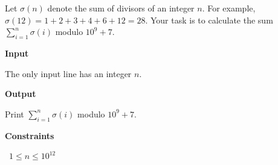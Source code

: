 Let $\sigma(n)$ denote the sum of divisors of an integer $n$. For example, $\sigma(12)=1+2+3+4+6+12=28$.
Your task is to calculate the sum $\sum_{i=1}^n \sigma(i)$ modulo $10^9+7$.

\vspace{0.3cm}\noindent\textbf{Input}

The only input line has an integer $n$.

\vspace{0.3cm}\noindent\textbf{Output}

Print $\sum_{i=1}^n \sigma(i)$ modulo $10^9+7$.

\vspace{0.3cm}\noindent\textbf{Constraints}

\textbullet\ $1 \le n \le 10^{12}$